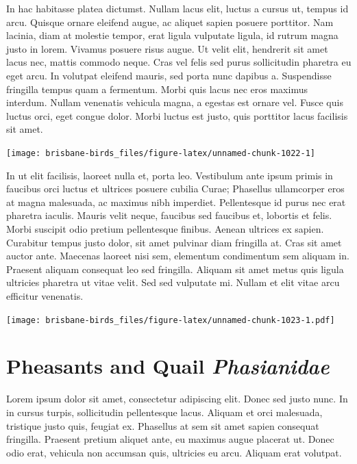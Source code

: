 \documentclass[]{book}
\let\origfigure\figure
\let\endorigfigure\endfigure
\renewenvironment{figure}[1][2] {
  \expandafter\origfigure\expandafter[H]
} {
  \endorigfigure
}
\begin{document}
In hac habitasse platea dictumst. Nullam lacus elit, luctus a cursus ut,
tempus id arcu. Quisque ornare eleifend augue, ac aliquet sapien posuere
porttitor. Nam lacinia, diam at molestie tempor, erat ligula vulputate
ligula, id rutrum magna justo in lorem. Vivamus posuere risus augue. Ut
velit elit, hendrerit sit amet lacus nec, mattis commodo neque. Cras vel
felis sed purus sollicitudin pharetra eu eget arcu. In volutpat eleifend
mauris, sed porta nunc dapibus a. Suspendisse fringilla tempus quam a
fermentum. Morbi quis lacus nec eros maximus interdum. Nullam venenatis
vehicula magna, a egestas est ornare vel. Fusce quis luctus orci, eget
congue dolor. Morbi luctus est justo, quis porttitor lacus facilisis sit
amet.

\begin{figure}
\texttt{[image: brisbane-birds\_files/figure-latex/unnamed-chunk-1022-1]} \caption{insert figure caption}\label{fig:unnamed-chunk-1022}
\end{figure}

In ut elit facilisis, laoreet nulla et, porta leo. Vestibulum ante ipsum
primis in faucibus orci luctus et ultrices posuere cubilia Curae;
Phasellus ullamcorper eros at magna malesuada, ac maximus nibh
imperdiet. Pellentesque id purus nec erat pharetra iaculis. Mauris velit
neque, faucibus sed faucibus et, lobortis et felis. Morbi suscipit odio
pretium pellentesque finibus. Aenean ultrices ex sapien. Curabitur
tempus justo dolor, sit amet pulvinar diam fringilla at. Cras sit amet
auctor ante. Maecenas laoreet nisi sem, elementum condimentum sem
aliquam in. Praesent aliquam consequat leo sed fringilla. Aliquam sit
amet metus quis ligula ultricies pharetra ut vitae velit. Sed sed
vulputate mi. Nullam et elit vitae arcu efficitur venenatis.

\begin{figure}
\centering
\texttt{[image: brisbane-birds\_files/figure-latex/unnamed-chunk-1023-1.pdf]}
\caption{\label{fig:unnamed-chunk-1023}insert figure caption}
\end{figure}

\chapter{\texorpdfstring{Pheasants and Quail
\emph{Phasianidae}}{Pheasants and Quail Phasianidae}}\label{pheasants-and-quail-phasianidae}

Lorem ipsum dolor sit amet, consectetur adipiscing elit. Donec sed justo
nunc. In in cursus turpis, sollicitudin pellentesque lacus. Aliquam et
orci malesuada, tristique justo quis, feugiat ex. Phasellus at sem sit
amet sapien consequat fringilla. Praesent pretium aliquet ante, eu
maximus augue placerat ut. Donec odio erat, vehicula non accumsan quis,
ultricies eu arcu. Aliquam erat volutpat.
\end{document}
